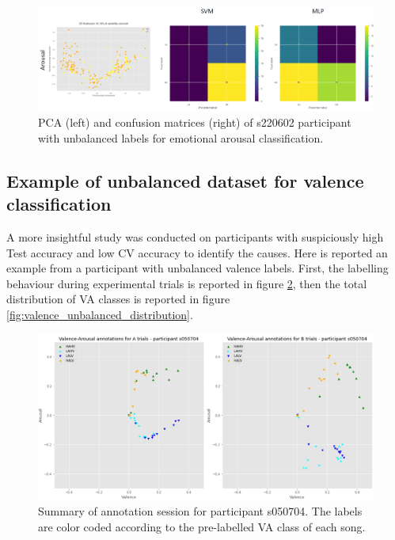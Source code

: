 \begin{figure}[!htb]
\includegraphics[width=16cm]{img/appendix/arousal_unbalanced_pca_confusion.png}
\centering
\caption{PCA (left) and confusion matrices (right) of s220602 participant with unbalanced labels for emotional arousal 
classification.}\label{fig:arousal_unbalanced_pca_confusion}
\end{figure}
\FloatBarrier
\subsection{Example of unbalanced dataset for valence classification}
\label{sec:appendix_A3.4}
A more insightful study was conducted on participants with suspiciously high Test accuracy and low CV accuracy to identify the causes. Here is reported an example from a participant with unbalanced valence labels. First, the labelling behaviour during experimental trials is reported in figure \ref{fig:valence_unbalanced}, then the total distribution of \ac{VA} classes is reported in figure \ref{fig:valence_unbalanced_distribution}.

\begin{figure}[!htb]
\includegraphics[width=16cm]{img/appendix/valence_unbalanced.png}
\centering
\caption{Summary of annotation session for participant s050704. The labels are color coded according to the pre-labelled 
VA class of each song.}\label{fig:valence_unbalanced}
\end{figure}

